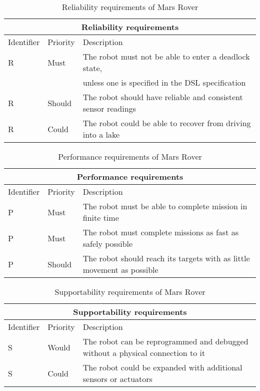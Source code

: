 \setcounter{TCC}{1}
\begin{table}[H]
	\centering
	\begin{tabular}{|l|l|l|}
		\hline
		\multicolumn{3}{|c|}{Reliability requirements} \\  \hline
		\hline
		Identifier & Priority & Description \\  
		\hline
		\hline
		R\doTCC & Must & The robot must not be able to enter a deadlock state,
			\\  
				& 		& unless one is specified in the DSL specification 
			\\  \hline
		R\doTCC & Should & The robot should have reliable and consistent 
			sensor readings \\  \hline
		R\doTCC & Could & The robot could be able to recover from driving into
			a lake \\  
		\hline
	\end{tabular}
\caption{Reliability requirements of Mars Rover}
\label{tbl:reliabilityReq}
\end{table}

\setcounter{TCC}{1}
\begin{table}[H]
	\centering
	\begin{tabular}{|l|l|l|}
		\hline
		\multicolumn{3}{|c|}{Performance requirements} \\  \hline
		\hline
		Identifier & Priority & Description \\  
		\hline
		\hline
		P\doTCC & Must & The robot must be able to complete mission in finite 
			time \\  \hline
		P\doTCC & Must & The robot must complete missions as fast as safely 
			possible \\   \hline
		P\doTCC & Should & The robot should reach its targets with as little 
			movement as possible \\  
		\hline
	\end{tabular}
\caption{Performance requirements of Mars Rover}
\label{tbl:performanceReq}
\end{table}

\setcounter{TCC}{1}
\begin{table}[H]
	\centering
	\begin{tabular}{|l|l|l|}
		\hline
		\multicolumn{3}{|c|}{Supportability requirements} \\  \hline
		\hline
		Identifier & Priority & Description \\  
		\hline
		\hline
		S\doTCC & Would & The robot can be reprogrammed and debugged without
			a physical connection to it \\  \hline
		S\doTCC & Could & The robot could be expanded with additional sensors
			or actuators \\  
		\hline
	\end{tabular}
\caption{Supportability requirements of Mars Rover}
\label{tbl:supportabilityReq}
\end{table}